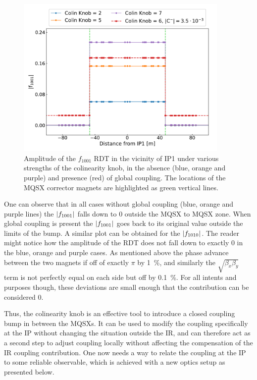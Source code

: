 \begin{figure}[!htb]
    \centering
    \includegraphics*[width=0.92\textwidth]{Figures/IR_Coupling_Correction/colinearity_knob_effect.pdf}
    \caption{Amplitude of the \(f_{1001}\) RDT in the vicinity of IP\num{1} under various strengths of the colinearity knob, in the absence (\textcolor{mplblue}{blue}, \textcolor{mplorange}{orange} and \textcolor{mplpurple}{purple}) and presence (\textcolor{mplred}{red}) of global coupling. The locations of the MQSX corrector magnets are highlighted as \textcolor{mqsx_green}{green} vertical lines.}
    \label{figure:colinearity_knob_effect}
\end{figure}

One can observe that in all cases without global coupling (\textcolor{mplblue}{blue}, \textcolor{mplorange}{orange} and \textcolor{mplpurple}{purple} lines) the \(\left\lvert f_{1001} \right\rvert\) falls down to \num{0} outside the MQSX to MQSX zone.
When global coupling is present the \(\left\lvert f_{1001} \right\rvert\) goes back to its original value outside the limits of the bump.
A similar plot can be obtained for the \(\left\lvert f_{1010} \right\rvert\).
The reader might notice how the amplitude of the RDT does not fall down to exactly \num{0} in the \textcolor{mplblue}{blue}, \textcolor{mplorange}{orange} and \textcolor{mplpurple}{purple} cases.
As mentioned above the phase advance between the two magnets if off of exactly \(\pi\) by \qty{1}{\percent}, and similarly the \(\sqrt{\beta_x \beta_y}\) term is not perfectly equal on each side but off by \qty{0.1}{\percent}.
For all intents and purposes though, these deviations are small enough that the contribution can be considered \num{0}.

Thus, the colinearity knob is an effective tool to introduce a closed coupling bump in between the MQSXs.
It can be used to modify the coupling specifically at the IP without changing the situation outside the IR, and can therefore act as a second step to adjust coupling locally without affecting the compensation of the IR coupling contribution.
One now needs a way to relate the coupling at the IP to some reliable observable, which is achieved with a new optics setup as presented below.


